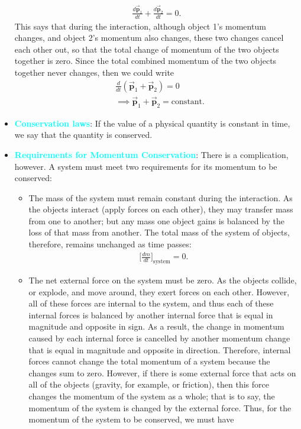 \documentclass{report}
\begin{document}
\begin{itemize}
            \begin{align*}
                \frac{d\vec{\mathbf{p}}_{1}}{dt} + \frac{d\vec{\mathbf{p}}_{2}}{dt} = 0
            .\end{align*}
            \bigbreak \noindent 
            This says that during the interaction, although object 1’s momentum changes, and object 2’s momentum also changes, these two changes cancel each other out, so that the total change of momentum of the two objects together is zero.
            \bigbreak \noindent 
            Since the total combined momentum of the two objects together never changes, then we could write
            \begin{align*}
                &\frac{d}{dt} (\vec{\mathbf{p}}_{1} + \vec{\mathbf{p}}_{2}) = 0 \\
                &\implies \vec{\mathbf{p}}_{1} + \vec{\mathbf{p}}_{2} = \text{constant}
            .\end{align*}
        \item \textbf{\textcolor{cyan}{Conservation laws}}:
            If the value of a physical quantity is constant in time, we say that the quantity is conserved.
        \item \textbf{\textcolor{cyan}{Requirements for Momentum Conservation}}:
            There is a complication, however. A system must meet two requirements for its momentum to be conserved:
            \begin{itemize}
                \item The mass of the system must remain constant during the interaction.
                    As the objects interact (apply forces on each other), they may transfer mass from one to another; but any mass one object gains is balanced by the loss of that mass from another. The total mass of the system of objects, therefore, remains unchanged as time passes:
                    \begin{align*}
                        \bigg[\frac{dm}{dt}\bigg]_{\text{system}} = 0
                    .\end{align*}
                \item The net external force on the system must be zero.
                    As the objects collide, or explode, and move around, they exert forces on each other. However, all of these forces are internal to the system, and thus each of these internal forces is balanced by another internal force that is equal in magnitude and opposite in sign. As a result, the change in momentum caused by each internal force is cancelled by another momentum change that is equal in magnitude and opposite in direction. Therefore, internal forces cannot change the total momentum of a system because the changes sum to zero. However, if there is some external force that acts on all of the objects (gravity, for example, or friction), then this force changes the momentum of the system as a whole; that is to say, the momentum of the system is changed by the external force. Thus, for the momentum of the system to be conserved, we must have

\end{itemize}
\end{itemize}
\end{document}
